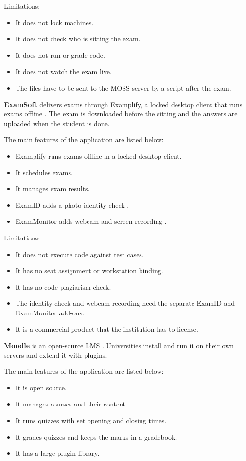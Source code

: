 \noindent Limitations:
\begin{itemize}[noitemsep]
\item It does not lock machines.
\item It does not check who is sitting the exam.
\item It does not run or grade code.
\item It does not watch the exam live.
\item The files have to be sent to the MOSS server by a script after the exam.
\end{itemize}

\noindent\textbf{ExamSoft} delivers exams through Examplify, a locked desktop client that runs exams offline \cite{examsoft1}. The exam is downloaded before the sitting and the answers are uploaded when the student is done.

\noindent The main features of the application are listed below:
\begin{itemize}[noitemsep]
\item Examplify runs exams offline in a locked desktop client.
\item It schedules exams.
\item It manages exam results.
\item ExamID adds a photo identity check \cite{examsoft_id}.
\item ExamMonitor adds webcam and screen recording \cite{examsoft_monitor}.
\end{itemize}

\noindent Limitations:
\begin{itemize}[noitemsep]
\item It does not execute code against test cases.
\item It has no seat assignment or workstation binding.
\item It has no code plagiarism check.
\item The identity check and webcam recording need the separate ExamID and ExamMonitor add-ons.
\item It is a commercial product that the institution has to license.
\end{itemize}

\noindent\textbf{Moodle} is an open-source LMS \cite{moodle1}. Universities install and run it on their own servers and extend it with plugins.

\noindent The main features of the application are listed below:
\begin{itemize}[noitemsep]
\item It is open source.
\item It manages courses and their content.
\item It runs quizzes with set opening and closing times.
\item It grades quizzes and keeps the marks in a gradebook.
\item It has a large plugin library.
\end{itemize}

